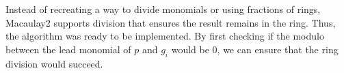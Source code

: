 Instead of recreating a way to divide monomials or using fractions of rings, Macaulay2 supports division that ensures the result remains in the ring. Thus, the algorithm was ready to be implemented. By first checking if the modulo between the lead monomial of $p$ and $g_i$ would be $0$, we can ensure that the ring division would succeed.